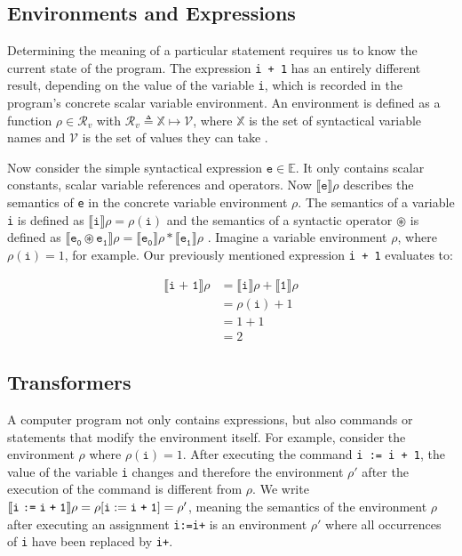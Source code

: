 \documentclass{report}
\begin{document}
\subsection{Environments and Expressions}

Determining the meaning of a particular statement requires us to know the current state of the program. The expression \texttt{i + 1} has an entirely different result, depending on the value of the variable \texttt{i}, which is recorded in the program's concrete scalar variable environment. An environment is defined as a function $\rho\in\mathcal{R}_v$ with $\mathcal{R}_v \triangleq \mathbb{X}\mapsto\mathcal{V}$, where $\mathbb{X}$ is the set of syntactical variable names and $\mathcal{V}$ is the set of values they can take \cite{cousot2011}.

Now consider the simple syntactical expression $\mathtt{e}\in\mathbb{E}$. It only contains scalar constants, scalar variable references and operators. Now $\llbracket\mathtt{e}\rrbracket\rho$ describes the semantics of \texttt{e} in the concrete variable environment $\rho$. The semantics of a variable \texttt{i} is defined as $\llbracket\mathtt{i}\rrbracket\rho=\rho(\mathtt{i})$ and the semantics of a syntactic operator $\circledast$ is defined as $\llbracket\mathtt{e_0\circledast e_1}\rrbracket\rho=\llbracket\mathtt{e_0}\rrbracket\rho \ast\llbracket\mathtt{e_1}\rrbracket\rho$ \cite{scott1971}. 
Imagine a variable environment $\rho$, where $\rho(\mathtt{i})=1$, for example. Our previously mentioned expression \texttt{i + 1} evaluates to:

\begin{equation*}
\begin{aligned}
\llbracket\mathtt{i \;\texttt{+}\; 1}\rrbracket\rho &=\llbracket\mathtt{i}\rrbracket\rho +\llbracket\mathtt{1}\rrbracket\rho \\
& = \rho(\mathtt{i}) + 1\\
& = 1+1\\
& = 2
\end{aligned}
\end{equation*}


\subsection{Transformers}\label{transformers}
A computer program not only contains expressions, but also commands or statements that modify the environment itself. For example, consider the environment $\rho$ where $\rho(\mathtt{i})=1$. After executing the command \texttt{i := i + 1}, the value of the variable \texttt{i} changes and therefore the environment $\rho'$ after the execution of the command is different from $\rho$. We write $\llbracket \texttt{i\;:=\;i\;+\;1} \rrbracket\rho=\rho[\mathtt{i}:=\texttt{i\;+\;1}]=\rho'$, meaning the semantics of the environment $\rho$ after executing an assignment \texttt{i\;:=\;i\;+} is an environment $\rho'$ where all occurrences of \texttt{i} have been replaced by \texttt{i\;+}.
\end{document}
